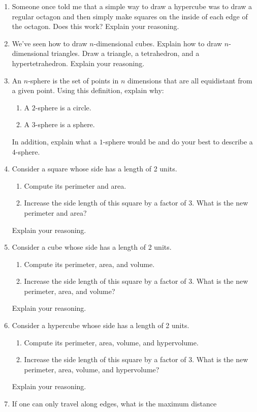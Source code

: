 \begin{enumerate}
\begin{center}
\begin{tabular}{|c || c| c| c|c|}
\end{tabular}
\end{center}
\item Someone once told me that a simple way to draw a hypercube was
  to draw a regular octagon and then simply make squares on the inside
  of each edge of the octagon. Does this work?  Explain your
  reasoning.
\item We've seen how to draw $n$-dimensional cubes. Explain how to
  draw $n$-dimensional triangles. Draw a triangle, a tetrahedron, and
  a hypertetrahedron. Explain your reasoning.
\item An $n$-sphere is the set of points in $n$ dimensions that are
  all equidistant from a given point. Using this definition, explain
  why:
\begin{enumerate}
\item A $2$-sphere is a circle.
\item A $3$-sphere is a sphere.
\end{enumerate}
In addition, explain what a $1$-sphere would be and do your best to
describe a $4$-sphere.
\item Consider a square whose side has a length of 2 units.
\begin{enumerate}
\item Compute its perimeter and area.
\item Increase the side length of this square by a factor of 3. What
  is the new perimeter and area?
\end{enumerate}
Explain your reasoning. 
\item Consider a cube whose side has a length of 2 units.
\begin{enumerate}
\item Compute its perimeter, area, and volume.
\item Increase the side length of this square by a factor of 3. What
  is the new perimeter, area, and volume?
\end{enumerate}
Explain your reasoning. 
\item Consider a hypercube whose side has a length of 2 units.
\begin{enumerate}
\item Compute its perimeter, area, volume, and hypervolume.
\item Increase the side length of this square by a factor of 3. What
  is the new perimeter, area, volume, and hypervolume?
\end{enumerate}
Explain your reasoning. 
\item If one can only travel along edges, what is the maximum distance

\end{enumerate}
